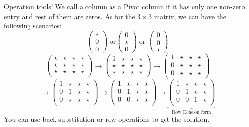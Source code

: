 \documentclass[11pt]{beamer}
\theoremstyle{plain}
\begin{document}
\begin{frame}{Operation tools!}
We call a column as a Pivot column if it has only one non-zero entry and rest of them are zeros. As for the $3\times3$ matrix, we can have the following scenarios:
$$
\begin{pmatrix}
    \star\\0\\0
\end{pmatrix}\text{ or}\begin{pmatrix}
    0\\\star\\0
\end{pmatrix}\text{ or }\begin{pmatrix}
    0\\0\\\star
\end{pmatrix}
$$
$$
\left(\begin{array}{ccc|c}
    \star & \star & \star & \star\\
    \star & \star & \star & \star\\
    \star & \star & \star & \star\\
\end{array}\right) \rightarrow \left(\begin{array}{ccc|c}
    1 & \star & \star & \star\\
    \star & \star & \star & \star\\
    \star & \star & \star & \star\\
\end{array}\right) \rightarrow \left(\begin{array}{ccc|c}
    1 & \star & \star & \star\\
    0 & \star & \star & \star\\
    0 & \star & \star & \star\\
\end{array}\right)$$
$$
\rightarrow \left(\begin{array}{ccc|c}
    1 & \star & \star & \star\\
    0 & 1 & \star & \star\\
    0 & \star & \star & \star\\
\end{array}\right) \rightarrow \left(\begin{array}{ccc|c}
    1 & \star & \star & \star\\
    0 & 1 & \star & \star\\
    0 & 0 & \star & \star\\
\end{array}\right) \rightarrow \underbrace{\left(\begin{array}{ccc|c}
    1 & \star & \star & \star\\
    0 & 1 & \star & \star\\
    0 & 0 & 1 & \star\\
\end{array}\right)}_{\text{Row Echelon form}}
$$
You can use back substitution or row operations to get the solution. 
\end{frame}
\end{document}

